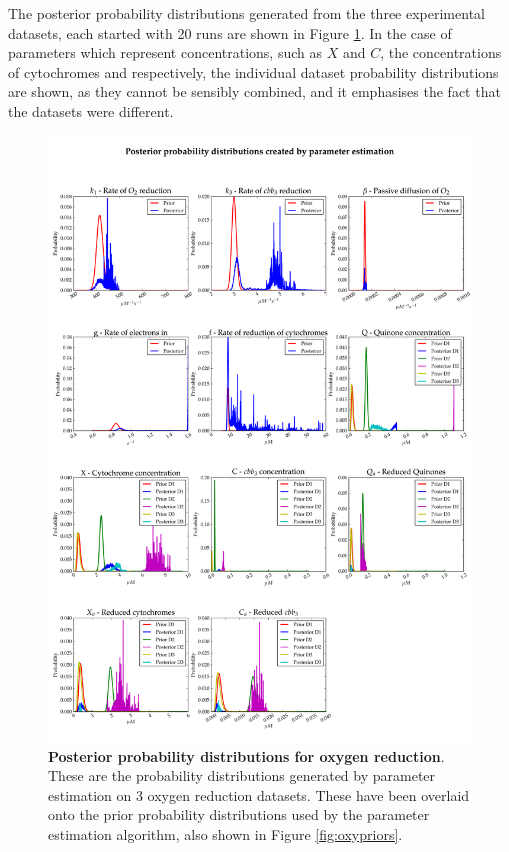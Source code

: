 The posterior probability distributions generated from the three experimental datasets, each started with 20 runs are shown in Figure \ref{fig:oxyposteriors}. In the case of parameters which represent concentrations, such as $X$ and $C$, the concentrations of cytochromes and \cbbthree{} respectively, the individual dataset probability distributions are shown, as they cannot be sensibly combined, and it emphasises the fact that the datasets were different.

\begin{figure}[tbp]
 \centering
 \includegraphics[width=15cm, trim=0cm 0cm 0cm 0cm]{./05-oxygenreduction/data/posteriors1.pdf}
 \caption[Posterior probability distributions for oxygen reduction]{{\bf Posterior probability distributions for oxygen reduction}. These are the probability distributions generated by parameter estimation on 3 oxygen reduction datasets. These have been overlaid onto the prior probability distributions used by the parameter estimation algorithm, also shown in Figure \ref{fig:oxypriors}.
 \label{fig:oxyposteriors}}
\end{figure}

